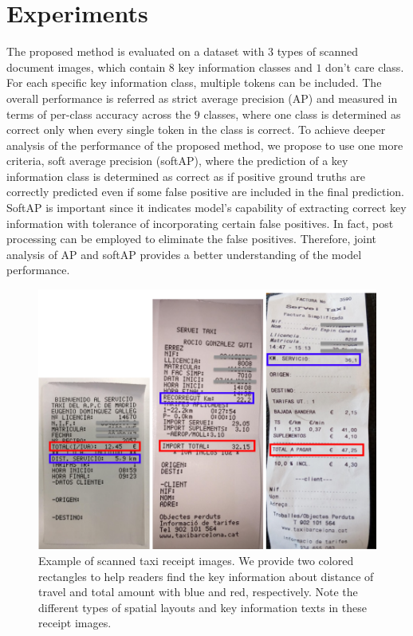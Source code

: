 \documentclass[10pt,twocolumn,letterpaper]{article}
\begin{document}
\section{Experiments}
\label{experiment}
The proposed method is evaluated on a dataset with $3$ types of scanned document images, which contain $8$ key information classes and $1$ don't care class. For each specific key information class, multiple tokens can be included. The overall performance is referred as strict average precision (AP) and measured in terms of per-class accuracy across the $9$ classes, where one class is determined as correct only when every single token in the class is correct. To achieve deeper analysis of the performance of the proposed method, we propose to use one more criteria, soft average precision (softAP), where the prediction of a key information class is determined as correct as if positive ground truths are correctly predicted even if some false positive are included in the final prediction. SoftAP is important since it indicates model's capability of extracting correct key information with tolerance of incorporating certain false positives. In fact, post processing can be employed to eliminate the false positives. Therefore, joint analysis of AP and softAP provides a better understanding of the model performance.

\begin{figure}
\begin{center}
\includegraphics[width=0.99\linewidth]{Receipts.png}
\end{center}
   \caption{Example of scanned taxi receipt images. We provide two colored rectangles to help readers find the key information about distance of travel and total amount with blue and red, respectively. Note the different types of spatial layouts and key information texts in these receipt images.}
\label{fig:receipts}
\end{figure}
\end{document}
